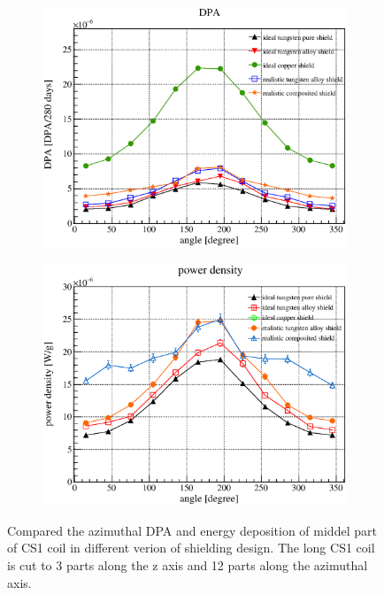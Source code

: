 \begin{figure}[H]
  \begin{subfigure}{0.3\textwidth}
   \centering
   \includegraphics[scale=0.43]{chapter3/fig/dpa.eps}
  \end{subfigure}
  \hspace{0.2\textwidth}
  \begin{subfigure}{0.3\textwidth}
   \centering
   \includegraphics[scale=0.43]{chapter3/fig/shieldheat.eps}
  \end{subfigure}
  \caption{Compared the azimuthal DPA and energy deposition of middel part of CS1 coil in different verion of shielding design. The long CS1 coil is cut to 3 parts along the z axis and 12 parts along the azimuthal axis.}
  \label{2dpa}
 \end{figure}
